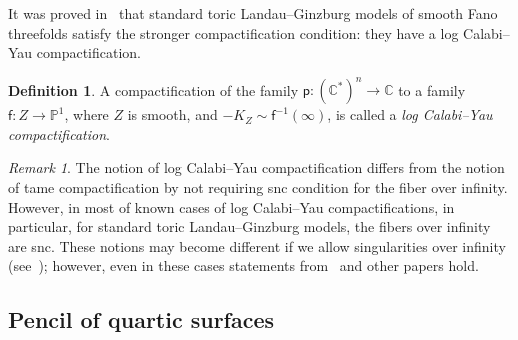 \documentclass[10pt]{amsart}
\numberwithin{equation}{section}
\theoremstyle{plain}
\theoremstyle{definition}
\newtheorem{definition}[theorem]{Definition}
\theoremstyle{remark}
\newtheorem{remark}[theorem]{Remark}
\begin{document}
It was proved in~\cite{przyjalkowski2017compactification} that standard toric Landau--Ginzburg models of smooth Fano threefolds satisfy the stronger compactification condition: they have a log Calabi--Yau compactification.

\begin{definition}\label{definition:log-CY}
  A compactification of the family \(\mathsf{p} \colon (\mathbb{C}^*)^n \rightarrow \mathbb{C}\) to a family \(\mathsf{f} \colon Z \rightarrow \mathbb{P}^1\), where \(Z\) is smooth, and \(-K_Z \sim \mathsf{f}^{-1}(\infty)\), is called a \emph{log Calabi--Yau compactification}.
\end{definition}

\begin{remark}
  The notion of log Calabi--Yau compactification
differs from the notion of tame compactification by not requiring snc condition for the fiber over infinity. However, in most of known cases of log Calabi--Yau compactifications, in particular, for standard toric Landau--Ginzburg models, the fibers over infinity are snc. These notions may become different if we allow singularities over infinity (see~\cite{przyjalkowski2022singular}); however, even in these cases statements from~\cite{katzarkov2017bogomolov} and other papers hold.
\end{remark}

\subsection{Pencil of quartic surfaces}
\end{document}
